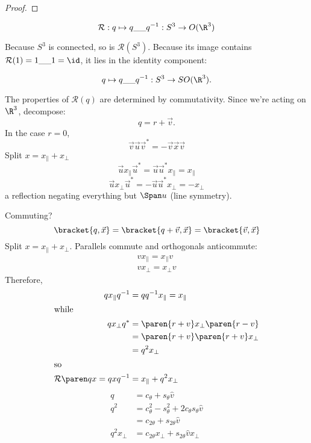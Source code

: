 \documentclass[draft]{scrartcl}
\newcommand{\SO}{SO}
\renewcommand{\O}{O}
\renewcommand{\blank}{\_\_}
\newcommand{\qrot}{\mathcal R}
\begin{document}
\begin{multicols*}{2}
\begin{proof}
  \end{proof}
  \begin{cor}
    \[
      \qrot: q\mapsto q\blank q^{-1}: S^3\to \O(\R^3)
    \]
  \end{cor}
  Because \(S^3\) is connected, so is \(\qrot(S^3)\). Because its image contains \(\qrot(1) = 1\blank 1 = \id\), it lies in the identity component:
  \begin{cor}
    \[
      q\mapsto q\blank q^{-1}: S^3\to \SO(\R^3).
    \]
  \end{cor}

  The properties of \(\qrot(q)\) are determined by commutativity.  Since we're acting on \(\R^3\), decompose:
  \[
    q = r + \vec v.
  \]
  In the case \(r=0\),
  \[
    \vec v \vec u \vec v^{*} = -\vec v \vec x \vec v
  \]
  Split \(x=x_\parallel + x_\perp\)
  \[
    \vec u x_\parallel \vec u^* = \vec u \vec u^{*} x_\parallel = x_\parallel
  \]
  \[
    \vec u x_\perp \vec u^* = -\vec u \vec u^{*} x_\perp = -x_\perp
  \]
  a reflection negating everything but \(\Span u\) (line symmetry).

  Commuting?
  \[
    \bracket{q,\vec x} = \bracket{q+\vec v, \vec x} = \bracket{\vec v, \vec x}
  \]
  Split \(x=x_\parallel+x_\perp\). Parallels commute and orthogonals anticommute:
  \begin{align*}
    v x_\parallel = x_\parallel v  \\
    v x_\perp = x_\perp v
  \end{align*}
  Therefore,
  \begin{align*}
    q x_\parallel q^{-1} &= qq^{-1}x_\parallel = x_\parallel \\
    \shortintertext{while}
    q x_\perp q^* &= \paren{r+ v}x_\perp \paren{r- v} \\
                  &=  \paren{r+ v}\paren{r+v}x_\perp \\
    &= q^2 x_\perp \\
      \shortintertext{so}
    \qrot\paren q x = qxq^{-1} &= x_\parallel + q^2 x_\perp
  \end{align*}
  \begin{align*}
    q &= c_\theta + s_\theta \hat v\\
    q^2 &= c_\theta^2 - s_\theta^2  + 2c_\theta s_\theta \hat v \\
      &= c_{2\theta} + s_{2\theta} \hat v \\
    q^2 x_\perp &= c_{2\theta} x_\perp + s_{2\theta}\hat v x_\perp
  \end{align*}



\end{multicols*}
\end{document}
